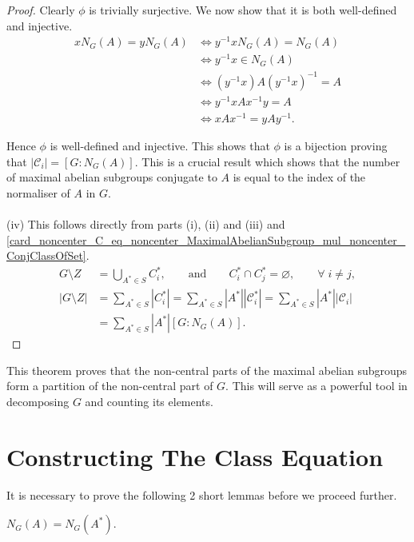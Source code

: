 \begin{proof}
Clearly $\phi$ is trivially surjective. We now show that it is both well-defined and injective.
\begin{align*} xN_G(A) = yN_G(A) &\iff y^{-1}xN_G(A) = N_G(A) \\
&\iff y^{-1}x \in N_G(A) \\
&\iff (y^{-1}x)A(y^{-1}x)^{-1} = A \\
&\iff y^{-1}xAx^{-1}y = A \\
&\iff xAx^{-1} = yAy^{-1}.
\end{align*}

Hence $\phi$ is well-defined and injective. This shows that $\phi$ is a bijection proving that $|\mathcal{C}_i| = [G:N_G(A)]$. This is a crucial result which shows that the number of maximal abelian subgroups conjugate to $A$ is equal to the index of the normaliser of $A$ in $G$. \\
\\
(iv) This follows directly from parts (i), (ii) and (iii) and \eqref{card_noncenter_C_eq_noncenter_MaximalAbelianSubgroup_mul_noncenter_ConjClassOfSet}.
\begin{align*} G \! \setminus \! Z &= \bigcup\limits_{A^* \in S} C_i^*,  \qquad \text{and}  \qquad C_i^* \cap C_j^* = \varnothing, \qquad \forall \;  i \neq j, \\
 |G \! \setminus \! Z| &=  \sum_{A^* \in S} |C_i^*| = \sum_{A^* \in S} |A^*||\mathcal{C}_i^*| = \sum_{A^* \in S} |A^*||\mathcal{C}_i|
\\ &= \sum_{A^* \in S} |A^*| [G:N_G(A)].
\end{align*}

\end{proof}

This theorem proves that the non-central parts of the maximal abelian subgroups form a partition of the non-central part of $G$. This will serve as a powerful tool in decomposing $G$ and counting its elements.

\section{Constructing The Class Equation}

It is necessary to prove the following 2 short lemmas before we proceed further.
 
\begin{lemma}
\label{normalizer_noncentral_eq}
 $N_G(A) =N_G(A^*)$.
\end{lemma}

